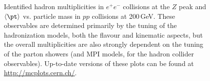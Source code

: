 \begin{figure}[tp]
  \centering
  \caption{Identified hadron multiplicities in $e^+e^-$ collisions at
    the $Z$ peak and $\langle \pt \rangle$ vs. particle mass in $pp$ collisions
    at 200\,GeV. These observables are determined primarily by the tuning
    of the hadronization models, both the flavour and kinematic aspects, but the
    overall multiplicities are also strongly dependent on the tuning of the
    parton showers (and MPI models, for the hadron collider observables).
    Up-to-date versions of these plots can be found at
    \url{http://mcplots.cern.ch/}.}
  \label{fig:cmp:idparticle-rates}
\end{figure}

